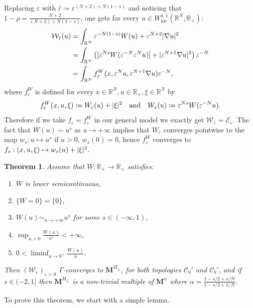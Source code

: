 \documentclass[10pt]{amsart}
\theoremstyle{plain}
\newtheorem{theorem}{Theorem}[section]
\theoremstyle{definition}
\newcommand{\R}{\mathbb{R}}
\newcommand{\Cspace}{\mathscr{C}}
\newcommand{\ener}{\mathcal{E}}
\newcommand{\mass}{\boldsymbol{M}}
\newcommand{\loc}{\mathrm{loc}}
\newcommand{\eps}{\varepsilon}
\DeclarePairedDelimiter{\abs}{\lvert}{\rvert}
\begin{document}
Replacing $\eps$ with $\bar \eps \coloneqq \eps^{(N+2)+N(1-s)}$ and noticing that $1-\rho = \frac{N+2}{(N+2)+N(1-s)}$, one gets for every $u\in W^{1,1}_\loc(\R^N,\R_+)$:
\begin{align*}
\mathcal W_{\bar \eps}(u)&= \int_{\R^N} \eps^{-N(1-s)} W(u) + \eps^{N+2} \abs{\nabla u}^2\\ &= \int_{\R^N} \left( [\eps^{Ns} W(\eps^{-N} \eps^N u)] + \abs{\eps^{N+1} \nabla u}^2 \right) \eps^{-N}\\
&= \int_{\R^N} f_\eps^W(x,\eps^N u,\eps^{N+1} \nabla u) \eps^{-N},
\end{align*}
where $f_\eps^W$ is defined for every $x\in \R^N,u\in \R_+, \xi \in \R^N$ by
\begin{equation*}
f_\eps^W(x,u,\xi) \coloneqq W_\eps(u) + \abs{\xi}^2 \quad \text{and}\quad W_\eps(u) \coloneqq \eps^{Ns} W(\eps^{-N}u).
\end{equation*}
Therefore if we take $f_\eps = f_\eps^W$ in our general model  we exactly get $\mathcal W_{\bar\eps} = \ener_\eps$. The fact that $W(u) \sim u^s$ as $u \to +\infty$ implies that $W_\eps$ converges pointwise to the map $w_s : u \mapsto u^s$ if $u > 0$, $w_s(0) = 0$, hence $f_\eps^W$ converges to $f_s : (x,u,\xi) \mapsto w_s(u) + \abs{\xi}^2$.
\begin{theorem}\label{GammaConvergenceW}
Assume that $W : \R_+ \to \R_+$ satisfies:
\begin{enumerate}[\textnormal{(HW}$_1$\textnormal{)},leftmargin=2.5\normalparindent]
\item\label{hypWlsc} $W$ is lower semicontinuous,
\item\label{hypWzero} $\{W = 0 \} = \{ 0\}$,
\item\label{hypWpower} $W(u) \sim_{u\to +\infty} u^s$ for some $s\in (-\infty,1)$,
\item\label{hypWbound} $\displaystyle\sup_{u>0} \frac{W(u)}{u^s} < +\infty$,
\item\label{hypWslope} $\displaystyle 0 < \liminf_{u\to 0^+}\frac{W(u)}u$.
\end{enumerate}
Then $(\mathcal W_\eps)_{\eps > 0}$ $\Gamma$-converges to $\mass^{H_{f_s}}$, for both topologies $\Cspace_0'$ and $\Cspace_b'$, and if $s \in (-2,1]$ then $\mass^{H_{f_s}}$ is a non-trivial multiple of $\mass^\alpha$ where $\alpha = \frac{1-s/2+s/N}{1-s/2+1/N}$.
\end{theorem}

To prove this theorem, we start with a simple lemma.
\end{document}
